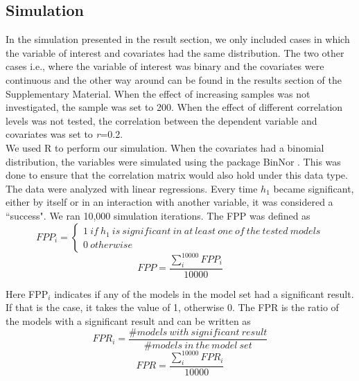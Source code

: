 \subsection{Simulation}
In the simulation presented in the result section, we only included cases in which the variable of interest and covariates had the same distribution. The two other cases i.e., where the variable of interest was binary and the covariates were continuous and the other way around can be found in the results section of the Supplementary Material. When the effect of increasing samples was not investigated, the sample was set to 200. When the effect of different correlation levels was not tested, the correlation between the dependent variable and covariates was set to \textit{r}=0.2.\\
We used R \citep{Team2018} to perform our simulation. When the covariates had a binomial distribution, the variables were simulated using the package BinNor \citep{Demirtas2014}. This was done to ensure that the correlation matrix would also hold under this data type. The data were analyzed with linear regressions. Every time $h_1$ became significant, either by itself or in an interaction with another variable, it was considered a “success". We ran  10,000 simulation iterations. The FPP was defined as \\

\[FPP_i=\left. \left\{\begin{array}{c}
1\ if\ h_1\ is\ significant\ in\ at\ least\ one \ of\ the\ tested\ models \\ 
0\ otherwise\  \end{array}
\right.\] 
\[FPP=\frac{\sum^{10000}_i{FPP_i}}{10000}\] 


Here FPP${}_{i}$ indicates if any of the models in the model set had a significant result. If that is the case, it takes the value of 1, otherwise 0. The FPR is the ratio of the models with a significant result and can be written as \\

\[FPR_i=\frac{\#models\ with\ significant\ result}{\#models\ in\ the\ model\ set}\] 
\[FPR=\frac{\sum^{10000}_i{FPR_i}}{10000}\] 



